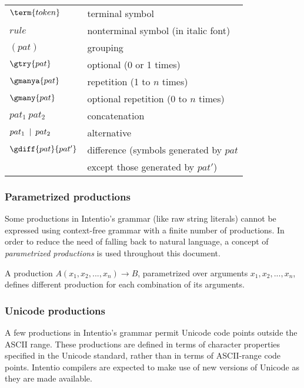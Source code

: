 \begin{bnfutils}
\begin{center}
\begin{tabular}[t]{ll}
  \(\term{token}\)        & terminal symbol \\
  \(rule\)                & nonterminal symbol (in italic font) \\
  \((pat)\)               & grouping \\
  \(\gtry{pat}\)          & optional (0 or 1 times) \\
  \(\gmanya{pat}\)        & repetition (1 to \(n\) times) \\
  \(\gmany{pat}\)         & optional repetition (0 to \(n\) times) \\
  \(pat_1 \ pat_2\)       & concatenation \\
  \(pat_1 \hskip0.5em\relax | \hskip0.5em\relax pat_2\)    & alternative \\
  \(\gdiff{pat}{pat'}\)   & difference (symbols generated by \(pat\) \\
                          & except those generated by \(pat'\))
\end{tabular}
\end{center}
\end{bnfutils}

\subsubsection*{Parametrized productions}

Some productions in Intentio's grammar (like raw string literals) cannot be expressed using context-free grammar with a finite number of productions. In order to reduce the need of falling back to natural language, a concept of \emph{parametrized productions} is used throughout this document.

A production \(A(x_1, x_2, ..., x_n) \rightarrow B\), parametrized over arguments \(x_1, x_2, ..., x_n\), defines different production for each combination of its arguments.

\subsubsection*{Unicode productions}

A few productions in Intentio's grammar permit Unicode\cite{Unicode} code points outside the ASCII range. These productions are defined in terms of character properties specified in the Unicode standard, rather than in terms of ASCII-range code points. Intentio compilers are expected to make use of new versions of Unicode as they are made available.

